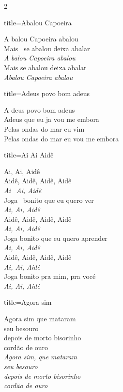 \documentclass[fontsize=14pt, paper=a4, twoside, DIV=20]{scrreprt} %
\begin{document}
\begin{multicols*}{2}
\begin{song}{title={Abalou Capoeira}}
\begin{verse*}
A balou Capoeira abalou\\
Mais \ se abalou deixa abalar\\
\textit{A} \textit{balou Capoeira abalou}\\
Mais se abalou deixa abalar\\
\textit{Abalou Capoeira abalou}\\

\end{verse*}
\end{song}

\begin{song}{title={Adeus povo bom adeus}}
    \begin{verse*}
         A deus povo bom adeus\\
        Adeus que eu ja vou me embora\\
        Pelas ondas do mar eu vim\\
        Pelas ondas do mar eu vou me embora\\
    \end{verse*}
        \end{song}
\pagebreak
\begin{song}{title={Ai Ai Aidê}}
    \begin{verse*}
     Ai, Ai, Aidê\\
    Aidê, Aidê, Aidê, Aidê\\
    \textit{Ai}  \ \textit{Ai, Aidê}\\
    Joga \ bonito que eu quero ver\\
    \textit{Ai, Ai, Aidê}\\
    Aidê, Aidê, Aidê, Aidê\\
    \textit{Ai, Ai, Aidê}\\
    Joga bonito que eu quero aprender\\
    \textit{Ai, Ai, Aidê}\\
    Aidê, Aidê, Aidê, Aidê\\
    \textit{Ai, Ai, Aidê}\\
    Joga bonito pra mim, pra vocé\\
    \textit{Ai, Ai, Aidê}\\
    \end{verse*}
    \end{song}

\begin{song}{title={Agora sim}}

\begin{verse*}
Agora sim que mataram\\
seu besouro\\
depois de morto bisorinho\\
cordão de ouro\\
\textit{Agora sim, que mataram}\\
\textit{seu besouro}\\
\textit{depois de morto bisorinho}\\
\textit{cordão de ouro}\\
\end{verse*}


\end{song}
\end{multicols*}
\end{document}
